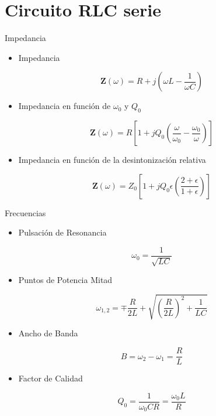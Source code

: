 \documentclass[aspectratio=169, usenames,svgnames,dvipsnames]{beamer}
\newcommand{\fasor}[1]{\mathbf{#1}(\omega)}
\begin{document}
\section{Circuito RLC serie}
\label{sec:org79c1b69}
\begin{frame}[label={sec:org3a7f85a}]{Impedancia}
\begin{itemize}
\item Impedancia
\end{itemize}
\[
  \fasor{Z} = R + j(\omega L - \frac{1}{\omega C})
\]
\begin{itemize}
\item Impedancia en función de \(\omega_0\) y \(Q_0\)
\end{itemize}
\[
  \fasor{Z} = R \left[1 + j Q_0 \left(\frac{\omega}{\omega_0} - \frac{\omega_0}{\omega}\right)\right]
\]

\begin{itemize}
\item Impedancia en función de la desintonización relativa
\end{itemize}
\[
  \fasor{Z} = Z_0 \left[ 1 + j Q_0 \epsilon\left(\frac{2 + \epsilon}{1 + \epsilon}\right)\right]
\]  
\end{frame}

\begin{frame}[label={sec:org1185424}]{Frecuencias}
\begin{itemize}
\item Pulsación de Resonancia
\end{itemize}
\[
  \omega_0 = \frac{1}{\sqrt{LC}}
\]
\begin{itemize}
\item Puntos de Potencia Mitad
\end{itemize}
\[
\omega_{1,2}= \mp \frac{R}{2L} + \sqrt{\left(\frac{R}{2L}\right)^2 + \frac{1}{LC}}
\]

\begin{itemize}
\item Ancho de Banda
\end{itemize}
\[
B = \omega_2 - \omega_1 = \frac{R}{L}
\]

\begin{itemize}
\item Factor de Calidad
\end{itemize}
\[
  Q_0 = \frac{1}{\omega_0 C R} = \frac{\omega_0 L}{R}
\]
\end{frame}
\end{document}
